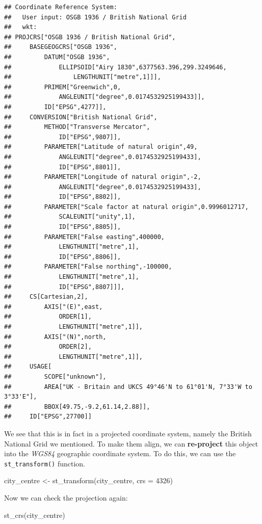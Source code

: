 \documentclass[
]{book}
\newenvironment{Shaded}{\begin{snugshade}}{\end{snugshade}}
\newcommand{\AttributeTok}[1]{\textcolor[rgb]{0.77,0.63,0.00}{#1}}
\newcommand{\DecValTok}[1]{\textcolor[rgb]{0.00,0.00,0.81}{#1}}
\newcommand{\FunctionTok}[1]{\textcolor[rgb]{0.00,0.00,0.00}{#1}}
\newcommand{\NormalTok}[1]{#1}
\newcommand{\OtherTok}[1]{\textcolor[rgb]{0.56,0.35,0.01}{#1}}
\begin{document}
\begin{verbatim}
## Coordinate Reference System:
##   User input: OSGB 1936 / British National Grid 
##   wkt:
## PROJCRS["OSGB 1936 / British National Grid",
##     BASEGEOGCRS["OSGB 1936",
##         DATUM["OSGB 1936",
##             ELLIPSOID["Airy 1830",6377563.396,299.3249646,
##                 LENGTHUNIT["metre",1]]],
##         PRIMEM["Greenwich",0,
##             ANGLEUNIT["degree",0.0174532925199433]],
##         ID["EPSG",4277]],
##     CONVERSION["British National Grid",
##         METHOD["Transverse Mercator",
##             ID["EPSG",9807]],
##         PARAMETER["Latitude of natural origin",49,
##             ANGLEUNIT["degree",0.0174532925199433],
##             ID["EPSG",8801]],
##         PARAMETER["Longitude of natural origin",-2,
##             ANGLEUNIT["degree",0.0174532925199433],
##             ID["EPSG",8802]],
##         PARAMETER["Scale factor at natural origin",0.9996012717,
##             SCALEUNIT["unity",1],
##             ID["EPSG",8805]],
##         PARAMETER["False easting",400000,
##             LENGTHUNIT["metre",1],
##             ID["EPSG",8806]],
##         PARAMETER["False northing",-100000,
##             LENGTHUNIT["metre",1],
##             ID["EPSG",8807]]],
##     CS[Cartesian,2],
##         AXIS["(E)",east,
##             ORDER[1],
##             LENGTHUNIT["metre",1]],
##         AXIS["(N)",north,
##             ORDER[2],
##             LENGTHUNIT["metre",1]],
##     USAGE[
##         SCOPE["unknown"],
##         AREA["UK - Britain and UKCS 49°46'N to 61°01'N, 7°33'W to 3°33'E"],
##         BBOX[49.75,-9.2,61.14,2.88]],
##     ID["EPSG",27700]]
\end{verbatim}

We see that this is in fact in a projected coordinate system, namely the British National Grid we mentioned. To make them align, we can \textbf{re-project} this object into the \emph{WGS84} geographic coordinate system. To do this, we can use the \texttt{st\_transform()} function.

\begin{Shaded}
\begin{Highlighting}[]
\NormalTok{city\_centre }\OtherTok{\textless{}{-}} \FunctionTok{st\_transform}\NormalTok{(city\_centre, }\AttributeTok{crs =} \DecValTok{4326}\NormalTok{)}
\end{Highlighting}
\end{Shaded}

Now we can check the projection again:

\begin{Shaded}
\begin{Highlighting}[]
\FunctionTok{st\_crs}\NormalTok{(city\_centre)}
\end{Highlighting}
\end{Shaded}
\end{document}
